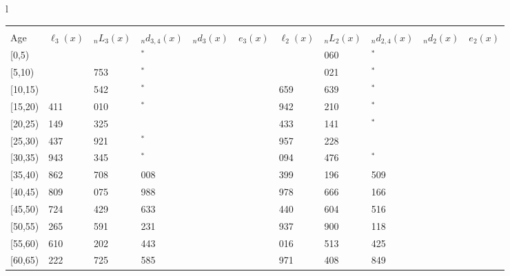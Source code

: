 \documentclass[
]{article}
\begin{document}
\begin{table}
\begin{tabular}[t]{l}
\end{tabular}
\centering
\begin{tabular}[t]{l}
\hline
\begin{tabular}{>{\raggedright\arraybackslash}p{.43in}>{\raggedleft\arraybackslash}p{.42in}>{\raggedleft\arraybackslash}p{.42in}>{\raggedleft\arraybackslash}p{.42in}>{\raggedleft\arraybackslash}p{.42in}>{\raggedleft\arraybackslash}p{.42in}>{\raggedleft\arraybackslash}p{.42in}>{\raggedleft\arraybackslash}p{.42in}>{\raggedleft\arraybackslash}p{.42in}>{\raggedleft\arraybackslash}p{.42in}>{\raggedleft\arraybackslash}p{.42in}}
\toprule
\multicolumn{1}{c}{ } & \multicolumn{5}{c}{(2) Lost mother only} & \multicolumn{5}{c}{(3) Lost father only} \\
\cmidrule(l{3pt}r{3pt}){2-6} \cmidrule(l{3pt}r{3pt}){7-11}
Age & $\ell_{3}(x)$ & ${}_nL_{3}(x)$ & ${}_nd_{3,4}(x)$ & ${}_nd_{3}(x)$ & $e_{3}(x)$ & $\ell_{2}(x)$ & ${}_nL_{2}(x)$ & ${}_nd_{2,4}(x)$ & ${}_nd_{2}(x)$ & $e_{2}(x)$\\
\midrule
{}[0,5) & 0 & 713 & 69$^{*}$ & 1 & 3 & 0 & 1 060 & 27$^{*}$ & 1 & 10\\
{}[5,10) & 382 & 2 753 & 46$^{*}$ & 0 & 3 & 790 & 6 021 & 0$^{*}$ & 0 & 10\\
{}[10,15) & 744 & 5 542 & 36$^{*}$ & 1 & 3 & 1 659 & 11 639 & 74$^{*}$ & 1 & 10\\
{}[15,20) & 1 411 & 10 010 & 172$^{*}$ & 3 & 3 & 2 942 & 19 210 & 37$^{*}$ & 6 & 10\\
{}[20,25) & 2 149 & 13 325 & 383 & 7 & 3 & 4 433 & 31 141 & 35$^{*}$ & 17 & 10\\
\addlinespace
{}[25,30) & 2 437 & 15 921 & 302$^{*}$ & 8 & 3 & 6 957 & 47 228 & 396 & 24 & 10\\
{}[30,35) & 2 943 & 19 345 & 523$^{*}$ & 11 & 3 & 10 094 & 67 476 & 444$^{*}$ & 38 & 9\\
{}[35,40) & 3 862 & 27 708 & 1 008 & 20 & 3 & 13 399 & 89 196 & 1 509 & 63 & 9\\
{}[40,45) & 4 809 & 32 075 & 1 988 & 32 & 2 & 15 978 & 111 666 & 3 166 & 110 & 8\\
{}[45,50) & 5 724 & 35 429 & 2 633 & 56 & 2 & 17 440 & 132 604 & 2 516 & 210 & 7\\
\addlinespace
{}[50,55) & 5 265 & 34 591 & 3 231 & 88 & 2 & 22 937 & 139 900 & 8 118 & 356 & 5\\
{}[55,60) & 4 610 & 30 202 & 3 443 & 114 & 1 & 20 016 & 127 513 & 9 425 & 482 & 4\\
{}[60,65) & 4 222 & 27 725 & 3 585 & 167 & 1 & 16 971 & 85 408 & 8 849 & 514 & 3\\

\end{tabular}
\end{tabular}
\end{table}
\end{document}
